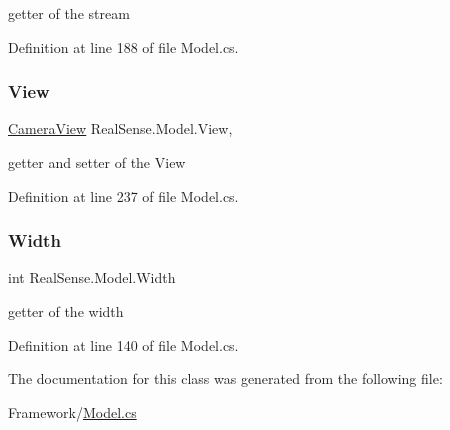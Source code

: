 getter of the stream 

Definition at line 188 of file Model.\+cs.

\mbox{\label{class_real_sense_1_1_model_ad06548f5b1e3b3bfeaca2635d2b24fc6}} 
\subsubsection{\texorpdfstring{View}{View}}
{\footnotesize\ttfamily \hyperlink{class_real_sense_1_1_camera_view}{Camera\+View} Real\+Sense.\+Model.\+View\hspace{0.3cm}{\ttfamily [get]}, {\ttfamily [set]}}

getter and setter of the View 

Definition at line 237 of file Model.\+cs.

\mbox{\label{class_real_sense_1_1_model_a20e2b5bc79da762b436b75ddd28f63b7}} 
\subsubsection{\texorpdfstring{Width}{Width}}
{\footnotesize\ttfamily int Real\+Sense.\+Model.\+Width\hspace{0.3cm}{\ttfamily [get]}}

getter of the width 

Definition at line 140 of file Model.\+cs.



The documentation for this class was generated from the following file\+:\begin{DoxyCompactItemize}
\item 
Framework/\hyperlink{_model_8cs}{Model.\+cs}\end{DoxyCompactItemize}

